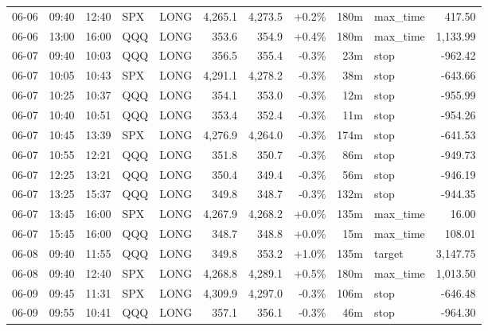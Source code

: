 \documentclass[11pt,a4paper,twoside]{article}
\begin{document}
\begin{center}
\begin{longtable}{>{\color{txtmain}}l l l l l r r r r >{\color{txtmain}}l r}
06-06 & 09:40 & 12:40 & SPX & LONG & 4,265.1 & 4,273.5 & \textcolor{wingreen}{+0.2\%} & 180m & max\_time & \textcolor{wingreen}{417.50} \\
06-06 & 13:00 & 16:00 & QQQ & LONG & 353.6 & 354.9 & \textcolor{wingreen}{+0.4\%} & 180m & max\_time & \textcolor{wingreen}{1,133.99} \\
06-07 & 09:40 & 10:03 & QQQ & LONG & 356.5 & 355.4 & \textcolor{lossred}{-0.3\%} & 23m & stop & \textcolor{lossred}{-962.42} \\
06-07 & 10:05 & 10:43 & SPX & LONG & 4,291.1 & 4,278.2 & \textcolor{lossred}{-0.3\%} & 38m & stop & \textcolor{lossred}{-643.66} \\
06-07 & 10:25 & 10:37 & QQQ & LONG & 354.1 & 353.0 & \textcolor{lossred}{-0.3\%} & 12m & stop & \textcolor{lossred}{-955.99} \\
06-07 & 10:40 & 10:51 & QQQ & LONG & 353.4 & 352.4 & \textcolor{lossred}{-0.3\%} & 11m & stop & \textcolor{lossred}{-954.26} \\
06-07 & 10:45 & 13:39 & SPX & LONG & 4,276.9 & 4,264.0 & \textcolor{lossred}{-0.3\%} & 174m & stop & \textcolor{lossred}{-641.53} \\
06-07 & 10:55 & 12:21 & QQQ & LONG & 351.8 & 350.7 & \textcolor{lossred}{-0.3\%} & 86m & stop & \textcolor{lossred}{-949.73} \\
06-07 & 12:25 & 13:21 & QQQ & LONG & 350.4 & 349.4 & \textcolor{lossred}{-0.3\%} & 56m & stop & \textcolor{lossred}{-946.19} \\
06-07 & 13:25 & 15:37 & QQQ & LONG & 349.8 & 348.7 & \textcolor{lossred}{-0.3\%} & 132m & stop & \textcolor{lossred}{-944.35} \\
06-07 & 13:45 & 16:00 & SPX & LONG & 4,267.9 & 4,268.2 & \textcolor{wingreen}{+0.0\%} & 135m & max\_time & \textcolor{wingreen}{16.00} \\
06-07 & 15:45 & 16:00 & QQQ & LONG & 348.7 & 348.8 & \textcolor{wingreen}{+0.0\%} & 15m & max\_time & \textcolor{wingreen}{108.01} \\
06-08 & 09:40 & 11:55 & QQQ & LONG & 349.8 & 353.2 & \textcolor{wingreen}{+1.0\%} & 135m & target & \textcolor{wingreen}{3,147.75} \\
06-08 & 09:40 & 12:40 & SPX & LONG & 4,268.8 & 4,289.1 & \textcolor{wingreen}{+0.5\%} & 180m & max\_time & \textcolor{wingreen}{1,013.50} \\
06-09 & 09:45 & 11:31 & SPX & LONG & 4,309.9 & 4,297.0 & \textcolor{lossred}{-0.3\%} & 106m & stop & \textcolor{lossred}{-646.48} \\
06-09 & 09:55 & 10:41 & QQQ & LONG & 357.1 & 356.1 & \textcolor{lossred}{-0.3\%} & 46m & stop & \textcolor{lossred}{-964.30} \\

\end{longtable}
\end{center}
\end{document}
